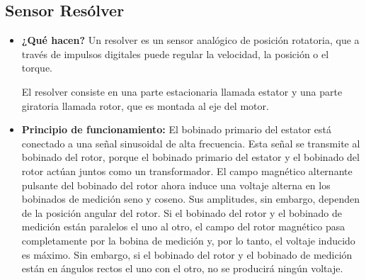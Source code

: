 \subsection*{Sensor Resólver}
\begin{itemize}
	\item \textbf{¿Qué hacen?} Un resolver es un sensor analógico de posición rotatoria, que a través de impulsos digitales puede regular la velocidad, la posición o el torque.
	
	El resolver consiste en una parte estacionaria llamada estator y una parte giratoria llamada rotor, que es montada al eje del motor.
	
	\item \textbf{Principio de funcionamiento:} El bobinado primario del estator está conectado a una señal sinusoidal de alta frecuencia. Esta señal se transmite al bobinado del rotor, porque el bobinado primario del estator y el bobinado del rotor actúan juntos como un transformador. El campo magnético alternante pulsante del bobinado del rotor ahora induce una voltaje alterna en los bobinados de medición seno y coseno. Sus amplitudes, sin embargo, dependen de la posición angular del rotor.
	Si el bobinado del rotor y el bobinado de medición están paralelos el uno al otro, el campo del rotor magnético pasa completamente por la bobina de medición y, por lo tanto, el voltaje inducido es máximo.
	Sin embargo, si el bobinado del rotor y el bobinado de medición están en ángulos rectos el uno con el otro, no se producirá ningún voltaje.
	

\end{itemize}
